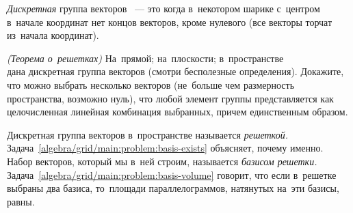 \emph{Дискретная} группа векторов ~--- это когда в~некотором шарике с~центром
в~начале координат нет концов векторов, кроме нулевого
(все векторы торчат из~начала координат).

\begin{problems}

\item\emph{(Теорема о~решетках)}
\label{algebra/grid/main:problem:basis-exists}%
\sp На~прямой;
\quad
\sp на~плоскости;
\quad
\sp в~пространстве
\\
дана дискретная группа векторов (смотри бесполезные определения).
Докажите, что можно выбрать несколько векторов (не~больше чем размерность
пространства, возможно нуль), что любой элемент группы представляется как
целочисленная линейная комбинация выбранных, причем единственным образом.

\end{problems}

Дискретная группа векторов в~пространстве называется \emph{решеткой.}
Задача~\ref{algebra/grid/main:problem:basis-exists} объясняет, почему именно.
Набор векторов, который мы в~ней строим, называется \emph{базисом решетки.}
Задача~\ref{algebra/grid/main:problem:basis-volume} говорит, что если в~решетке
выбраны два базиса, то~площади параллелограммов, натянутых на~эти базисы, равны.

\endgroup %

